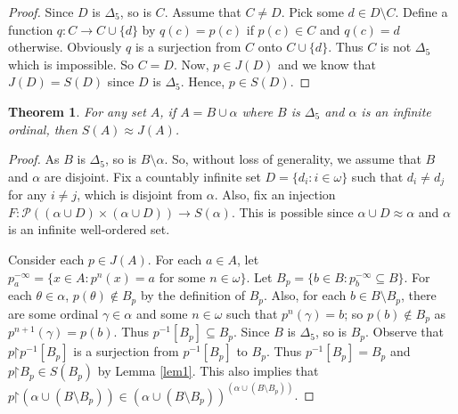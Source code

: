 \documentclass[a4paper,12pt,review]{article} %
\newtheorem{thm}{Theorem}[section]
\theoremstyle{definition}
\numberwithin{equation}{section}
\renewcommand{\restriction}{\mathord{\upharpoonright}}
\begin{document}
\begin{proof}
    Since $D$ is $\Delta_{5}$, so is $C$. Assume that $C\neq D$. Pick some $d\in D\setminus C$. Define a function $q:C\to C\cup\{d\}$ by $q(c)=p(c)$ if $p(c)\in C$ and $q(c)=d$ otherwise. Obviously $q$ is a surjection from $C$ onto $C\cup\{d\}$. Thus $C$ is not $\Delta_{5}$ which is impossible. So $C=D$. Now, $p\in J(D)$ and we know that $J(D)=S(D)$ since $D$ is $\Delta_{5}$. Hence, $p\in S(D)$.
\end{proof}

\begin{thm}
    For any set $A$, if $A = B\cup\alpha$ where $B$ is $\Delta_{5}$ and $\alpha$ is an infinite ordinal, then $S(A)\approx J(A)$.
\end{thm}

\begin{proof}
    As $B$ is $\Delta_{5}$, so is $B\setminus\alpha$. So, without loss of generality, we assume that $B$ and $\alpha$ are disjoint. Fix a countably infinite set $D=\{d_{i}:i\in\omega\}$ such that $d_{i}\neq d_{j}$ for any $i\neq j$, which is disjoint from $\alpha$. Also, fix an injection $F:\mathcal{P}((\alpha\cup D)\times(\alpha\cup D))\to S(\alpha)$. This is possible since $\alpha\cup D\approx \alpha$ and $\alpha$ is an infinite well-ordered set.
    
    Consider each $p\in J(A)$. For each $a\in A$, let $p^{-\infty}_{a}=\{x\in A:p^{n}(x)=a\text{ for some }n\in\omega\}$. Let $B_{p}=\{b\in B:p^{-\infty}_{b}\subseteq B \}$. For each $\theta\in\alpha$, $p(\theta)\not\in B_{p}$ by the definition of $B_{p}$. Also, for each $b\in B\setminus B_{p}$, there are some ordinal $\gamma\in\alpha$ and some $n\in\omega$ such that $p^{n}(\gamma)=b$; so $p(b)\not\in B_{p}$ as $p^{n+1}(\gamma)=p(b)$. Thus $p^{-1}[B_{p}]\subseteq B_{p}$. Since $B$ is $\Delta_{5}$, so is $B_{p}$. Observe that $p\restriction p^{-1}[B_{p}]$ is a surjection from $p^{-1}[B_{p}]$ to $B_{p}$. Thus $p^{-1}[B_{p}]=B_{p}$ and $p\restriction B_{p}\in S(B_{p})$ by Lemma \ref{lem1}. This also implies that $p\restriction (\alpha\cup(B\setminus B_{p}))\in (\alpha\cup(B\setminus B_{p}))^{(\alpha\cup(B\setminus B_{p}))}$.
    

\end{proof}
\end{document}

